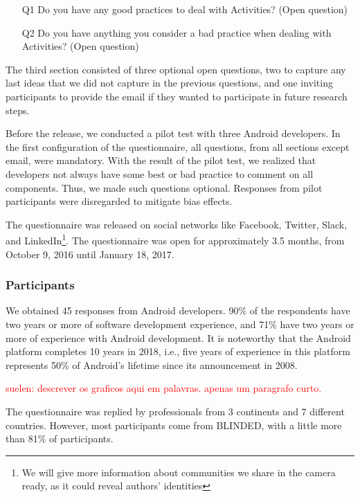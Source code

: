 \begin{itemize}
  \item[Q1] Do you have any good practices to deal with Activities? (Open question)
  \item[Q2] Do you have anything you consider a bad practice when dealing with Activities? (Open question)
\end{itemize}


The third section consisted of three optional open questions, 
two to capture any last ideas that we did not capture in the previous questions, and one inviting participants to provide the email if they wanted to participate in future research steps.

Before the release, we conducted a pilot test with three Android developers. In the first configuration of the questionnaire, all questions, from all sections except email, were mandatory. With the result of the pilot test, we realized that developers not always have some best or bad practice to comment on all components. Thus, we made such questions optional. Responses from pilot participants were disregarded to mitigate bias effects.

The questionnaire was released on social networks like Facebook, Twitter, Slack, and LinkedIn\footnote{We will give more information about communities we share in the camera ready, as it could reveal authors' identities}. The questionnaire was open for approximately 3.5 months, from October 9, 2016 until January 18, 2017.

\subsubsection{Participants}
\label{etapa-1-participantes}

We obtained 45 responses from Android developers. 
90\% of the respondents have two years or more of software development experience, 
and 71\% have two years or more of experience with Android development. 
It is noteworthy that the Android platform completes 10 years in 2018, i.e., 
five years of experience in this platform represents 50\% of Android's lifetime
since its announcement in 2008.

\textcolor{red}{suelen: descrever os graficos aqui em palavras. apenas um paragrafo curto.}

The questionnaire was replied by professionals from 3 continents and 7 different countries.
However, most participants come from BLINDED, with a little more than 81\% of participants.

